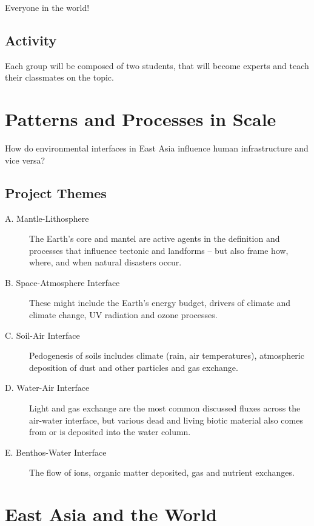 Everyone in the world!

\subsection{Activity}

Each group will be composed of two students, that will become experts and teach their classmates on the topic. 


\section{Patterns and Processes in Scale}

How do environmental interfaces in East Asia influence human infrastructure and vice versa?

\subsection{Project Themes}

\begin{description}
	\item[A. Mantle-Lithosphere] The Earth's core and mantel are active agents in the definition and processes that influence tectonic and landforms -- but also frame how, where, and when natural disasters occur. 
	\item[B. Space-Atmosphere Interface] These might include the Earth's energy budget, drivers of climate and climate change, UV radiation and ozone processes.
	\item[C. Soil-Air Interface] Pedogenesis of soils includes climate (rain, air temperatures), atmospheric deposition of dust and other particles and gas exchange. 
	\item[D. Water-Air Interface] Light and gas exchange are the most common discussed fluxes across the air-water interface, but various dead and living biotic material also comes from or is deposited into the water column.
	\item[E. Benthos-Water Interface] The flow of ions, organic matter deposited, gas and nutrient exchanges.
\end{description}

\section{East Asia and the World}
